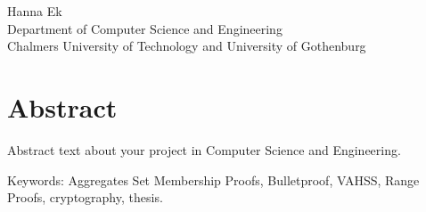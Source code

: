\oneLineTitle\\
\oneLineSubtitle\\
Hanna Ek\\
Department of Computer Science and Engineering\\
Chalmers University of Technology and University of Gothenburg\setlength{\parskip}{0.5cm}

\thispagestyle{plain}			%
\setlength{\parskip}{0pt plus 1.0pt}
\section*{Abstract}
Abstract text about your project in  Computer Science and Engineering.

\vfill
Keywords: Aggregates Set Membership Proofs, Bulletproof, VAHSS,  Range Proofs, cryptography,  thesis.

\newpage				%
\thispagestyle{empty}
\mbox{}